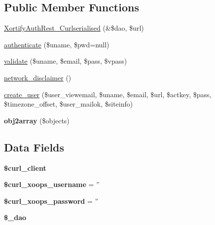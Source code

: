 \subsection*{Public Member Functions}
\begin{DoxyCompactItemize}
\item 
\hyperlink{class_xortify_auth_rest___curlserialised_a830d8746a22e602284bf83fcd432ec07}{Xortify\-Auth\-Rest\-\_\-\-Curlserialised} (\&\$dao, \$url)
\item 
\hyperlink{class_xortify_auth_rest___curlserialised_a00678ba307326b734e6c679f28bea315}{authenticate} (\$uname, \$pwd=null)
\item 
\hyperlink{class_xortify_auth_rest___curlserialised_a91121a1b702dfd20fb65a027c8ed26ec}{validate} (\$uname, \$email, \$pass, \$vpass)
\item 
\hyperlink{class_xortify_auth_rest___curlserialised_a1874c27b6f81a3f2ff9015405ad0f8bc}{network\-\_\-disclaimer} ()
\item 
\hyperlink{class_xortify_auth_rest___curlserialised_ac72efc5ad313a592cf6706876f56f7ec}{create\-\_\-user} (\$user\-\_\-viewemail, \$uname, \$email, \$url, \$actkey, \$pass, \$timezone\-\_\-offset, \$user\-\_\-mailok, \$siteinfo)
\item 
\hypertarget{class_xortify_auth_rest___curlserialised_aabc52e4f78557f0e0b360a8aaba6e11d}{{\bfseries obj2array} (\$objects)}\label{class_xortify_auth_rest___curlserialised_aabc52e4f78557f0e0b360a8aaba6e11d}

\end{DoxyCompactItemize}
\subsection*{Data Fields}
\begin{DoxyCompactItemize}
\item 
\hypertarget{class_xortify_auth_rest___curlserialised_a402f2112991f3227835af80e9df33e38}{{\bfseries \$curl\-\_\-client}}\label{class_xortify_auth_rest___curlserialised_a402f2112991f3227835af80e9df33e38}

\item 
\hypertarget{class_xortify_auth_rest___curlserialised_aab7480ba9f878a02b2c9fd43922fa070}{{\bfseries \$curl\-\_\-xoops\-\_\-username} = ''}\label{class_xortify_auth_rest___curlserialised_aab7480ba9f878a02b2c9fd43922fa070}

\item 
\hypertarget{class_xortify_auth_rest___curlserialised_a6c9851541ed3826c67cfe7224c38f0b8}{{\bfseries \$curl\-\_\-xoops\-\_\-password} = ''}\label{class_xortify_auth_rest___curlserialised_a6c9851541ed3826c67cfe7224c38f0b8}

\item 
\hypertarget{class_xortify_auth_rest___curlserialised_a12a029c610f699b4b25e79a1f64a3485}{{\bfseries \$\-\_\-dao}}\label{class_xortify_auth_rest___curlserialised_a12a029c610f699b4b25e79a1f64a3485}

\end{DoxyCompactItemize}


